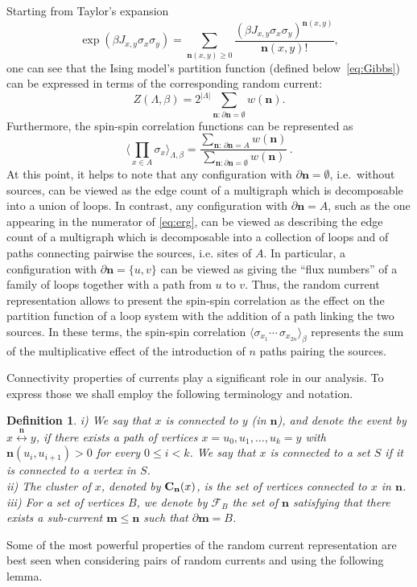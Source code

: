 \documentclass[a4paper,oneside,11pt]{article}
\newtheorem{definition}[theorem]{Definition}
\newcommand{\be}[1]{\begin{equation}\label{#1}}
\newcommand{\ee}{\end{equation}}
\numberwithin{equation}{section}
\numberwithin{equation}{section}
\numberwithin{equation}{section}
\newcommand{\calF}{\mathcal{F}}
\def\be{\begin{equation}}
\def\ee{\end{equation}}
\newcommand{\n}{\mathbf{n}}
\newcommand{\m}{\mathbf m}
\begin{document}
Starting from Taylor's expansion
\be
\exp(\beta J_{x,y}\sigma_x\sigma_y)=\sum_{\n(x,y)\ge0} \frac{(\beta J_{x,y}\sigma_x\sigma_y)^{\n(x,y)}}{\n(x,y)!},
\ee
one can see that the Ising model's partition function (defined below~\eqref{eq:Gibbs}) can be expressed in terms of the corresponding random current: 
\begin{equation}\label{eq:8}
Z (\Lambda,\beta)=2^{|\Lambda|}\sum_{\n:\partial\n=\emptyset} w(\n).
\end{equation}
Furthermore, the spin-spin correlation functions can be represented as 
\begin{equation}\label{eq:erg}
\langle\prod_{x\in A}\sigma_x\rangle_{\Lambda,\beta}=\frac{\displaystyle\sum_{\n:\, \partial\n=A}w(\n)}{\displaystyle\sum_{\n:\partial\n=\emptyset}w(\n)}\,.
\end{equation}
At this point, it helps to note that any configuration with $\partial\n=\emptyset$, i.e.~without sources, can be viewed as the edge count of a multigraph which is decomposable into a union of loops.  In contrast, any configuration with $\partial\n=A$, such as the one appearing in the numerator of \eqref{eq:erg}, can be viewed as describing the edge count of a multigraph which is decomposable into a collection of loops and of paths connecting pairwise the sources, i.e. sites of $A$.  
In particular, 
a configuration with 
$\partial\n = \{u,v\}$ can be viewed as giving the ``flux numbers'' of a family  of loops together with a path from $u$ to $v$.  Thus, the random current representation allows to present the spin-spin correlation as the effect on the partition function of a loop system with the addition of a path linking the two sources.   In these terms, the spin-spin correlation 
$\langle  \sigma_{ x_1} \cdots \,\sigma_{ x_{2n}} \rangle_\beta$  represents the sum of the multiplicative effect of the introduction of $n$ paths pairing the sources.    



Connectivity properties of currents   play a significant role in our analysis.  To express those we shall employ  the following terminology and notation.  
\begin{definition}
i) We say that $x$ is {\em connected} to $y$ (in $\n$), and denote the event by $x\stackrel{\n}\leftrightarrow y$,  if there exists a path of vertices $x=u_0,u_1,\dots, u_k=y$ with $\n(u_i,u_{i+1})>0$ for every $0\le i<k$.  We say that $x$ is connected to a set $S$ if it is connected to a vertex in $S$.  \\ 
ii) The {\em cluster} of $x$, denoted by ${\bf C}_\n(x)$, is the set of vertices connected to $x$ in $\n$.\\ 
iii) For a set of vertices $B$, we denote by $\calF_B$  the set of $\n$ satisfying that  there exists a sub-current  $\m\le \n$ such that $\partial\m=B$.
\end{definition}
Some of the most powerful properties of the random current representation are best seen when considering pairs of random currents and using the following lemma.  
\end{document}
